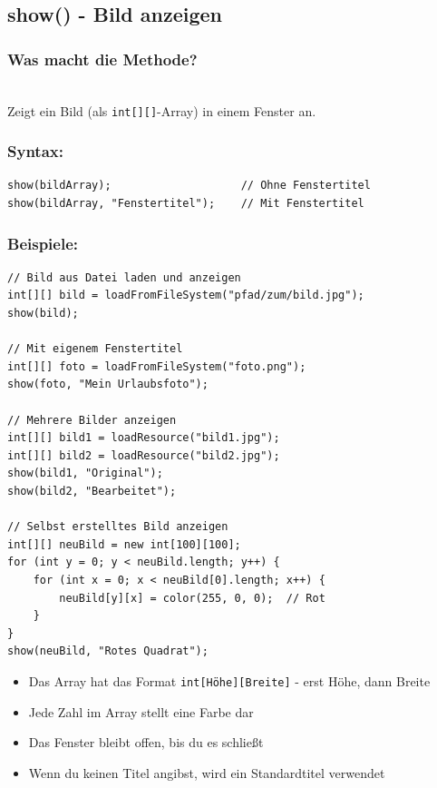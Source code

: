 \newpage


\subsection*{show() - Bild anzeigen}

\subsubsection*{Was macht die Methode?}\\
Zeigt ein Bild (als \texttt{int[][]}-Array) in einem Fenster an.

\subsubsection*{Syntax:}
\begin{lstlisting}
show(bildArray);                    // Ohne Fenstertitel
show(bildArray, "Fenstertitel");    // Mit Fenstertitel
\end{lstlisting}

\subsubsection*{Beispiele:}
\begin{lstlisting}
// Bild aus Datei laden und anzeigen
int[][] bild = loadFromFileSystem("pfad/zum/bild.jpg");
show(bild);

// Mit eigenem Fenstertitel
int[][] foto = loadFromFileSystem("foto.png");
show(foto, "Mein Urlaubsfoto");

// Mehrere Bilder anzeigen
int[][] bild1 = loadResource("bild1.jpg");
int[][] bild2 = loadResource("bild2.jpg");
show(bild1, "Original");
show(bild2, "Bearbeitet");

// Selbst erstelltes Bild anzeigen
int[][] neuBild = new int[100][100];
for (int y = 0; y < neuBild.length; y++) {
    for (int x = 0; x < neuBild[0].length; x++) {
        neuBild[y][x] = color(255, 0, 0);  // Rot
    }
}
show(neuBild, "Rotes Quadrat");
\end{lstlisting}

\begin{achtung}
	\begin{itemize}
		\item Das Array hat das Format \texttt{int[Höhe][Breite]} - erst Höhe, dann Breite
		\item Jede Zahl im Array stellt eine Farbe dar
		\item Das Fenster bleibt offen, bis du es schließt
		\item Wenn du keinen Titel angibst, wird ein Standardtitel verwendet
	\end{itemize}
\end{achtung}

